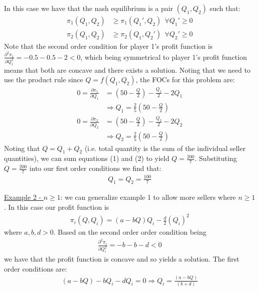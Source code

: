 \documentclass{article}
\begin{document}
  In this case we have that the nash equilibrium is a pair $(Q_{1}, Q_{2})$ such that:
  \begin{align*}
    \pi_{1}(Q_{1}, Q_{2}) &\geq \pi_{1}(Q_{1}', Q_{2}) \ \ \forall Q_{1}' \geq 0 \\
    \pi_{2}(Q_{1},Q_{2}) &\geq \pi_{2}(Q_{1}, Q_{2}') \ \ \forall Q_{2}' \geq 0
  \end{align*}
  Note that the second order condition for player 1's profit function is $\tfrac{\partial^{2} \pi_{1}}{\partial Q_{1}^{2}} = -0.5 -0.5 -2 < 0$, which being symmetrical to player 1's profit function means that both are concave and there exists a solution. Noting that we need to use the product rule since $Q = f(Q_{1}, Q_{2})$, the FOCs for this problem are:
  \begin{align*}
    0 = \frac{\partial \pi_{1}}{\partial Q_{1}} &= (50 - \frac{Q}{2}) - \frac{Q_{1}}{2} - 2Q_{1} \\
    &\Rightarrow Q_{1} = \frac{2}{5} (50 - \frac{Q}{2}) \ \tag{1} \\
    0 = \frac{\partial \pi_{2}}{\partial Q_{2}} &= (50 - \frac{Q}{2}) - \frac{Q_{2}}{2} - 2Q_{2} \\
    &\Rightarrow Q_{2} = \frac{2}{5}(50 - \frac{Q}{2}) \ \tag{2}
  \end{align*}
  Noting that $Q = Q_{1} + Q_{2}$ (i.e. total quantity is the sum of the individual seller quantities), we can sum equations (1) and (2) to yield $Q = \tfrac{200}{7}$. Substituting $Q = \tfrac{200}{7}$ into our first order conditions we find that:
  \begin{gather*}
    Q_{1} = Q_{2} = \frac{100}{7}
  \end{gather*}
  \par
  \underline{Example 2 - $n \geq 1$}: we can generalize example 1 to allow more sellers where $n \geq 1$. In this case our profit function is
  \begin{gather*}
    \pi_{i}(Q, Q_{i}) = (a - bQ)Q_{i} - \frac{d}{2}(Q_{i})^{2}
  \end{gather*}
  where $a,b,d > 0$. Based on the second order order condition being
  \begin{gather*}
    \frac{\partial^{2} \pi_{i}}{\partial Q_{i}^{2}} = -b -b - d < 0
  \end{gather*}
  we have that the profit function is concave and so yields a solution. The first order conditions are:
  \begin{gather*}
    (a-bQ) - bQ_{i} - dQ_{i} = 0 \Rightarrow Q_{i} = \frac{(a - bQ)}{(b + d)}
  \end{gather*}
\end{document}
